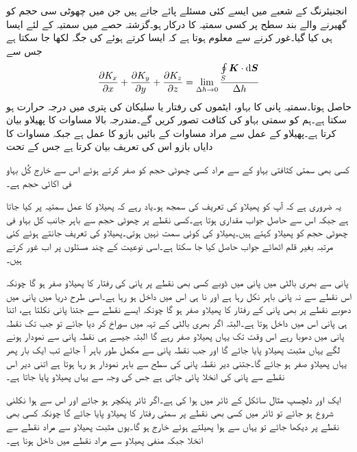 انجنیئرنگ  کے شعبے میں ایسے کئی مسئلے پائے جاتے ہیں جن  میں چھوٹی سی حجم  کو گھیرنے والے بند سطح پر کسی سمتیہ  کا   درکار ہو۔گزشتہ حصے میں سمتیہ  کے لئے ایسا ہی کیا گیا۔غور کرنے سے معلوم ہوتا ہے کہ ایسا کرتے ہوئے   کی جگہ  لکھا جا سکتا ہے جس سے 
\begin{align}\label{مساوات_گاؤس_کارتیسی_پھیلاو_کی_تعریف}
\frac{\partial K_x}{\partial x}+\frac{\partial K_y}{\partial y}+\frac{\partial K_z}{\partial z}=\lim_{\Delta h \to 0}\frac{\oint\limits_{S}\kvec{K}\cdot \dif \kvec{S}}{\Delta h}
\end{align}
حاصل ہوتا۔سمتیہ  پانی کا بہاو، ایٹموں کی رفتار یا سلیکان کی پتری میں درجہ حرارت ہو سکتا ہے۔ہم  کو سمتی بہاو کی کثافت تصور کریں گے۔مندرجہ بالا مساوات   کا پھیلاو بیان کرتا ہے۔پھیلاو کے عمل سے مراد مساوات کے بائیں بازو کا عمل ہے  جبکہ مساوات کا دایاں بازو اس کی تعریف بیان کرتا ہے جس کے تحت

کسی بھی سمتی کثافتی بہاو کے  سے مراد کسی  چھوٹی حجم کو صفر کرتے ہوئے اس  سے خارج کُل بہاو فی اکائی حجم ہے۔ 

یہ ضروری ہے کہ آپ کو پھیلاو کی تعریف کی سمجھ ہو۔یاد رہے کہ پھیلاو کا عمل سمتیہ پر کیا جاتا ہے جبکہ اس سے حاصل جواب مقداری ہوتا ہے۔کسی نقطے پر چھوٹی حجم سے باہر جانب کل بہاو فی چھوٹی حجم کو پھیلاو کہتے ہیں۔پھیلاو کی کوئی سمت نہیں ہوتی۔پھیلاو کی تعریف جانتے ہوئے کئی مرتبہ بغیر قلم اٹھائے جواب حاصل کیا جا سکتا ہے۔اسی نوعیت کے چند مسئلوں پر اب غور کرتے ہیں۔

پانی سے بھری بالٹی میں پانی میں ڈوبے کسی بھی نقطے پر پانی کی رفتار کا پھیلاو صفر ہو گا چونکہ اس نقطے سے نہ پانی باہر نکل رہا ہے اور نا ہی اس میں داخل ہو رہا ہے۔اسی طرح دریا میں پانی میں دھوبے نقطے پر بھی پانی کے رفتار کا پھیلاو صفر ہو گا چونکہ ایسے نقطے سے جتنا پانی نکلتا ہے، اتنا ہی پانی اس میں داخل ہوتا ہے۔البتہ اگر بھری بالٹی کے تہہ میں سوراخ کر دیا جائے  تو جب تک نقطہ پانی میں دھوبا رہے اس وقت تک یہاں پھیلاو صفر رہے  گا البتہ جیسے ہی نقطہ پانی سے نمودار ہونے لگے یہاں مثبت پھیلاو پایا جائے گا اور جب نقطہ پانی سے مکمل طور باہر آ جائے تب ایک بار پھر یہاں پھیلاو صفر ہو جائے گا۔جتنی دیر نقطہ پانی کی سطح سے باہر نمودار ہو رہا ہوتا ہے اتنی دیر اس نقطے سے پانی کی انخلا پائی جاتی ہے جس کی وجہ سے یہاں پھیلاو پایا جاتا ہے۔

ایک اور دلچسپ مثال سائکل کے ٹائر میں ہوا کی ہے۔اگر ٹائر پنکچر ہو جائے اور اس سے ہوا نکلنی شروع ہو جائے تو ٹائر میں کسی بھی نقطے پر سمتی رفتار کا پھیلاو پایا جائے گا چونکہ کسی بھی نقطے پر دیکھا جائے تو یہاں سے ہوا پھیلتے ہوئے خارج ہو گا۔یوں مثبت پھیلاو سے مراد نقطے سے انخلا جبکہ منفی پھیلاو سے مراد نقطے میں داخل ہونا ہے۔ 

